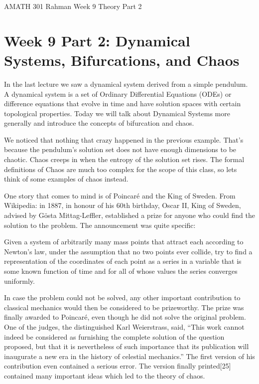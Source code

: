 \documentclass[reqno]{amsart}
\theoremstyle{definition}
\begin{document}
\begin{flushleft}
{\sc \Large AMATH 301 Rahman} \hfill Week 9 Theory Part 2
\bigskip
\end{flushleft}

\newcommand{\R}{\mathbb{R}}
\newcommand{\N}{\mathbb{N}}
\newcommand{\Z}{\mathbb{Z}}
\newcommand{\Q}{\mathbb{Q}}
\renewcommand{\CancelColor}{\color{red}}
\newcommand{\?}{\stackrel{?}{=}}
\renewcommand{\varphi}{\phi}
\newcommand{\card}{\text{Card}}
\newcommand{\bigzero}{\text{\Huge 0}}
\newcommand{\curvearrowdown}{{\color{red}\rotatebox{90}{$\curvearrowleft$}}}
\newcommand{\curvearrowup}{{\color{red}\rotatebox{90}{$\curvearrowright$}}}



\section*{Week 9 Part 2:  Dynamical Systems, Bifurcations, and Chaos}

In the last lecture we saw a dynamical system derived from a simple pendulum.  A dynamical system is a set of Ordinary Differential Equations (ODEs) or difference equations that evolve in time and have solution spaces with certain topological properties.  Today we will talk about Dynamical Systems more generally and introduce the concepts of bifurcation and chaos.

We noticed that nothing that crazy happened in the previous example.  That's because the pendulum's solution set does not have enough dimensions to be chaotic.  Chaos creeps in when the entropy of the solution set rises.  {\color{red} The formal definitions of Chaos are much too complex for the scope of this class, so lets think of some examples of chaos instead.}

One story that comes to mind is of Poincar\'{e} and the King of Sweden.  From Wikipedia: in 1887, in honour of his 60th birthday, Oscar II, King of Sweden, advised by G\"{o}sta Mittag-Leffler, established a prize for anyone who could find the solution to the problem. The announcement was quite specific:

Given a system of arbitrarily many mass points that attract each according to Newton's law, under the assumption that no two points ever collide, try to find a representation of the coordinates of each point as a series in a variable that is some known function of time and for all of whose values the series converges uniformly.

In case the problem could not be solved, any other important contribution to classical mechanics would then be considered to be prizeworthy. The prize was finally awarded to Poincar\'{e}, even though he did not solve the original problem. One of the judges, the distinguished Karl Weierstrass, said, ``This work cannot indeed be considered as furnishing the complete solution of the question proposed, but that it is nevertheless of such importance that its publication will inaugurate a new era in the history of celestial mechanics.''  The first version of his contribution even contained a serious error. The version finally printed[25] contained many important ideas which led to the theory of chaos.
\end{document}
